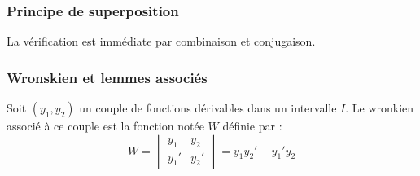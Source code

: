 \subsubsection{Principe de superposition}
La vérification est immédiate par combinaison et conjugaison.

\subsubsection{Wronskien et lemmes associés}

\begin{defi}[wronskien]
 Soit $(y_1,y_2)$ un couple de fonctions dérivables dans un intervalle $I$. Le wronkien associé à ce couple est la fonction notée $W$ définie par :
\begin{displaymath}
 W = 
\begin{vmatrix}
 y_1 & y_2 \\
y_1' & y_2'
\end{vmatrix}
= y_1y_2' - y_1'y_2
\end{displaymath}
\end{defi}

